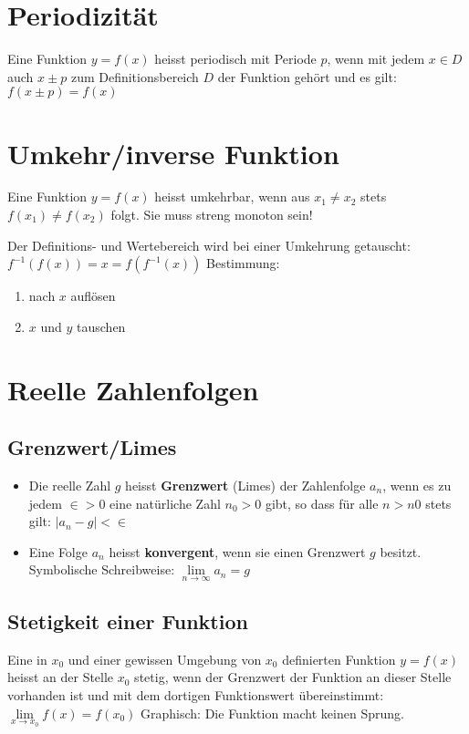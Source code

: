 \section{Periodizität}
Eine Funktion \(y = f(x)\) heisst periodisch mit Periode \(p\), wenn mit jedem \(x \in D\) auch \(x \pm p\) zum Definitionsbereich \(D\) der Funktion gehört und es gilt:
\newline \(f(x \pm p) = f(x)\)

\section{Umkehr/inverse Funktion}
Eine Funktion \(y = f(x)\) heisst umkehrbar, wenn aus \(x_{1} \neq x_{2}\) stets \(f(x_{1}) \neq f(x_{2})\) folgt. Sie muss streng monoton sein!
\par
Der Definitions- und Wertebereich wird bei einer Umkehrung getauscht:
\newline \(f^{-1}(f(x)) = x = f(f^{-1}(x))\)
\newline Bestimmung:
\begin{enumerate}
	\item nach \(x\) auflösen
	\item \(x\) und \(y\) tauschen
\end{enumerate}
\section{Reelle Zahlenfolgen}
\subsection{Grenzwert/Limes}
\begin{itemize}
	\item Die reelle Zahl \(g\) heisst \textbf{Grenzwert} (Limes) der Zahlenfolge \(a_{n}\), wenn es zu jedem \(\in > 0\) eine natürliche Zahl \(n_{0} > 0\) gibt, so dass für alle \(n > n{0}\) stets gilt: \(|a_{n}-g| < \in \)
	\item Eine Folge \(a_{n}\) heisst \textbf{konvergent}, wenn sie einen Grenzwert \(g\) besitzt.
	\newline Symbolische Schreibweise: \(\lim\limits_{n \rightarrow \infty}{a_n} = g \)
\end{itemize}

\subsection{Stetigkeit einer Funktion}
Eine in \(x_0\) und einer gewissen Umgebung von \(x_0\) definierten Funktion \(y=f(x)\) heisst an der Stelle \(x_0\) stetig, wenn der Grenzwert der Funktion an dieser Stelle vorhanden ist und mit dem dortigen Funktionswert übereinstimmt:
\newline
\hspace*{10mm}\(\lim\limits_{x \rightarrow x_0}{f(x)} = f(x_0)\)
\newline Graphisch: Die Funktion macht keinen Sprung.

